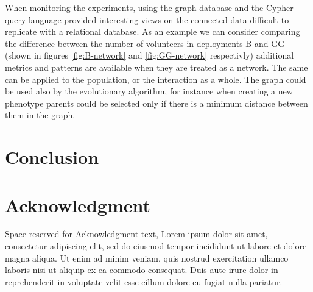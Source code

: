 \documentclass[conference]{IEEEtran}
\begin{document}
When monitoring the experiments, using the graph database and the Cypher query language 
provided interesting views on the connected data difficult to replicate with a relational database. 
As an example we can consider comparing the difference between the number of volunteers in deployments
B and GG (shown in figures \ref{fig:B-network} and \ref{fig:GG-network} respectivly) additional
metrics and patterns are available when they are treated as a
network. %
The same can be applied to 
the population, or the interaction as a whole. The graph could be used also by the evolutionary
algorithm, for instance when creating a new phenotype 
parents could be selected only if there is a minimum distance between them in the graph.

\section{Conclusion}
\label{sec:conclusions}



\section*{Acknowledgment}
Space reserved for Acknowledgment text, Lorem ipsum dolor sit amet, consectetur adipiscing elit,
sed do eiusmod tempor incididunt ut labore et dolore magna aliqua. Ut enim ad minim veniam, quis 
nostrud exercitation ullamco laboris nisi ut aliquip ex ea commodo consequat. Duis aute irure dolor
in reprehenderit in voluptate velit esse cillum dolore eu fugiat nulla pariatur. 







%
%
%


\end{document}
